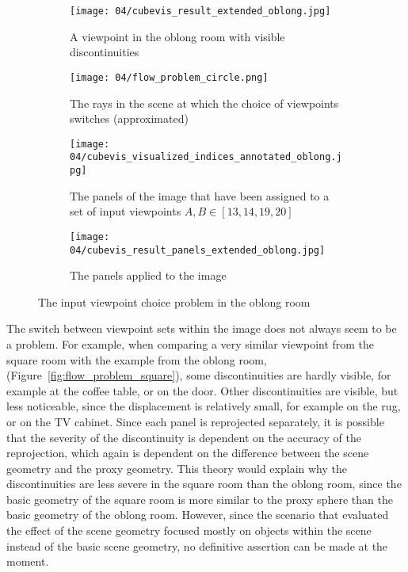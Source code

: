 \begin{figure}[p]
\centering
    \hfill
    \begin{subfigure}[c]{0.45\textwidth}
            \centering
            \texttt{[image: 04/cubevis\_result\_extended\_oblong.jpg]}
            \caption{A viewpoint in the oblong room with visible discontinuities}
    \end{subfigure}
    \hfill
    \begin{subfigure}[c]{0.45\textwidth}
            \centering
            \texttt{[image: 04/flow\_problem\_circle.png]}
            \caption{The rays in the scene at which the choice of viewpoints switches (approximated)}
    \end{subfigure}
    \hfill

    \hfill
    \begin{subfigure}[c]{0.45\textwidth}
            \centering
            \texttt{[image: 04/cubevis\_visualized\_indices\_annotated\_oblong.jpg]}
            \caption{The panels of the image that have been assigned to a set of input viewpoints $A, B \in [13, 14, 19, 20]$}
    \end{subfigure}
    \hfill
    \begin{subfigure}[c]{0.45\textwidth}
            \centering
            \texttt{[image: 04/cubevis\_result\_panels\_extended\_oblong.jpg]}
            \caption{The panels applied to the image}
    \end{subfigure}
    \hfill
  \caption{The input viewpoint choice problem in the oblong room} \label{fig:flow_problem_oblong}
\end{figure}

The switch between viewpoint sets within the image does not always seem to be a problem. For example, when comparing a very similar viewpoint from the square room with the example from the oblong room, (Figure~\ref{fig:flow_problem_square}), some discontinuities are hardly visible, for example at the coffee table, or on the door. Other discontinuities are visible, but less noticeable, since the displacement is relatively small, for example on the rug, or on the TV cabinet.
Since each panel is reprojected separately, it is possible that the severity of the discontinuity is dependent on the accuracy of the reprojection, which again is dependent on the difference between the scene geometry and the proxy geometry.
This theory would explain why the discontinuities are less severe in the square room than the oblong room, since the basic geometry of the square room is more similar to the proxy sphere than the basic geometry of the oblong room.
However, since the scenario that evaluated the effect of the scene geometry focused mostly on objects within the scene instead of the basic scene geometry, no definitive assertion can be made at the moment. %

